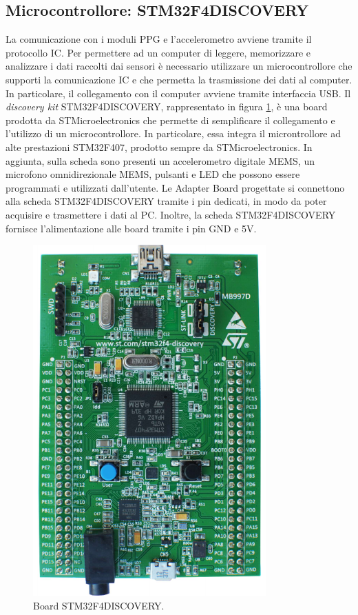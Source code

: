 \subsection{Microcontrollore: STM32F4DISCOVERY}
La comunicazione con i moduli PPG e l'accelerometro avviene tramite il protocollo IC. Per permettere ad un computer di leggere, memorizzare e analizzare i dati raccolti dai sensori è necessario utilizzare un microcontrollore che supporti la comunicazione IC e che permetta la trasmissione dei dati al computer. In particolare, il collegamento con il computer avviene tramite interfaccia USB. Il \textit{discovery kit} STM32F4DISCOVERY\cite{STMicroelectronics2020}, rappresentato in figura \ref{fig:ImmagineSTM32F4DISCOVERY}, è una board prodotta da STMicroelectronics che permette di semplificare il collegamento e l'utilizzo di un microcontrollore. In particolare, essa integra il microntrollore ad alte prestazioni STM32F407, prodotto sempre da STMicroelectronics. In aggiunta, sulla scheda sono presenti un accelerometro digitale MEMS, un microfono omnidirezionale MEMS, pulsanti e LED che possono essere programmati e utilizzati dall'utente. Le Adapter Board progettate si connettono alla scheda STM32F4DISCOVERY tramite i pin dedicati, in modo da poter acquisire e trasmettere i dati al PC. Inoltre, la scheda STM32F4DISCOVERY fornisce l'alimentazione alle board tramite i pin GND e 5V.
\begin{figure}[h]
	\centering
	\includegraphics[width=0.5\linewidth]{ImageFiles/Hardware/ImmagineSTM32F4DISCOVERY}
	\caption{Board STM32F4DISCOVERY.}
	\label{fig:ImmagineSTM32F4DISCOVERY}
\end{figure}

\clearpage